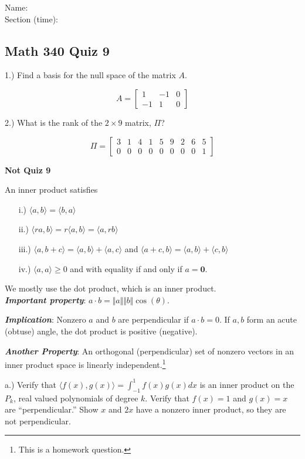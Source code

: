 \documentclass{article}
\begin{document}
Name:\\
\medskip
Section (time):

\subsection*{Math 340 Quiz 9}

1.) Find a basis for the null space of the matrix $A$. 

$$ A= \left[ \begin{array}{ccc}
1 & -1 & 0\\
-1 & 1 & 0
\end{array}\right]$$

2.) What is the rank of the $2\times9$ matrix, $\Pi$?

$$ \Pi= \left[ \begin{array}{ccccccccc}
3 & 1 & 4 & 1 & 5 & 9 & 2 & 6 & 5\\
0 & 0 & 0 & 0 & 0 & 0 & 0 & 0 & 1
\end{array}\right]$$

\pagebreak
\textbf{Not Quiz 9}

An inner product satisfies

\begin{itemize}
\item[i.)] $\langle a,b \rangle= \langle b,a \rangle$
\item[ii.)] $\langle ra,b \rangle = r\langle a,b \rangle= \langle a,rb \rangle$
\item[iii.)] $\langle a,b+c \rangle = \langle a,b \rangle + \langle a,c \rangle$ and $\langle a+c,b \rangle = \langle a,b \rangle + \langle c,b \rangle$
\item[iv.)] $\langle a,a \rangle \geq 0$ and with equality if and only if $a=\mathbf{0}$.
\end{itemize}
\bigskip

We mostly use the dot product, which is an inner product.\\
\qquad \textbf{\emph{Important property}}: $a\cdot b = \Vert a\Vert \Vert b \Vert \cos(\theta)$. 
\smallskip{}

\textbf{\emph{Implication}}: Nonzero $a$ and $b$ are perpendicular if $a\cdot b = 0$. If $a,b$ form an acute (obtuse) angle, the dot product is positive (negative).
\smallskip{}

\textbf{\emph{Another Property}}: An orthogonal (perpendicular) set of nonzero vectors in an inner product space is linearly independent.\footnote{This is a homework question.}

\smallskip
a.) Verify that $\langle f(x),g(x) \rangle = \int_{-1}^{1} f(x)g(x) dx$ is an inner product on the $P_k$, real valued polynomials of degree $k$. Verify that $f(x)=1$ and $g(x)=x$ are ``perpendicular.'' Show $x$ and $2x$ have a nonzero inner product, so they are not perpendicular.
\end{document}
